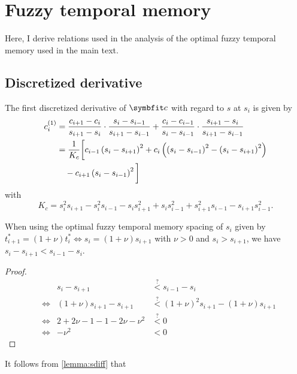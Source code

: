 \chapter{Fuzzy temporal memory}
Here, I derive relations used in the analysis of the optimal fuzzy temporal memory \parencite{shankar2013} used in the main  text.

\section{Discretized derivative}\label{apdx:fuzzymem-derivative}
The first discretized derivative of $\vc c$ with regard to $s$ at $s_i$ is given by \parencite{shankar2013}
\begin{equation}\begin{split}
    c_i^{(1)} &= \frac{c_{i+1} - c_i}{s_{i+1} - s_i} \cdot \frac{s_i - s_{i-1}}{s_{i+1} - s_{i-1}} + \frac{c_i - c_{i-1}}{s_i - s_{i-1}} \cdot \frac{s_{i+1} - s_i}{s_{i+1} - s_{i-1}} \\
    &= \frac{1}{K_c} \bigg[c_{i-1} \del{s_i - s_{i+1}}^2 + c_i \del{\del{s_i - s_{i-1}}^2 - \del{s_i - s_{i+1}}^2}\\&\quad - c_{i+1} \del{s_i - s_{i-1}}^2 \bigg]
\end{split}\end{equation}
with
\begin{equation*}
    K_c = s_i^2 s_{i+1} - s_i^2 s_{i-1} - s_i s_{i+1}^2 + s_i s_{i-1}^2 + s_{i+1}^2 s_{i-1} - s_{i+1} s_{i-1}^2 \text{.}
\end{equation*}
\begin{lemma}\label{lemma:sdiff}
    When using the optimal fuzzy temporal memory spacing of $s_i$ given by $t^*_{i+1} = (1 + \nu) t^*_i \Leftrightarrow s_i = (1 + \nu) s_{i+1}$ with $\nu > 0$ and $s_i > s_{i+1}$, we have $s_i - s_{i+1} < s_{i-1} - s_i$.
    \begin{proof}
        \begin{align*}
            && s_i - s_{i+1} &\stackrel{?}{<} s_{i-1} - s_i \\
            &\Leftrightarrow& (1+\nu) s_{i+1} - s_{i+1} &\stackrel{?}{<} {(1+\nu)}^2 s_{i+1} - (1+\nu) s_{i+1} \\
            &\Leftrightarrow& 2 + 2\nu - 1 - 1 - 2\nu - \nu^2 &\stackrel{?}{<} 0 \\
            &\Leftrightarrow& -\nu^2 &< 0
        \end{align*}
    \end{proof}
\end{lemma}
\noindent It follows from \cref{lemma:sdiff} that
